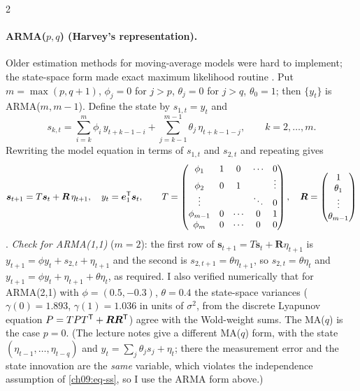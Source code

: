 \begin{paracol}{2}
\paragraph{ARMA($p,q$) (Harvey's representation).} Older estimation methods for moving-average models were hard to implement; the state-space form made exact maximum likelihood routine
. Put $m=\max(p,q+1)$, $\phi_j=0$ for $j>p$, $\theta_j=0$ for $j>q$, $\theta_0=1$; then $\{y_t\}$ is ARMA($m,m-1$). Define the state by $s_{1,t}=y_t$ and
\[
  s_{k,t}=\sum_{i=k}^{m}\phi_i\,y_{t+k-1-i}+\sum_{j=k-1}^{m-1}\theta_j\,\eta_{t+k-1-j},\qquad k=2,\dots,m .
\]
Rewriting the model equation in terms of $s_{1,t}$ and $s_{2,t}$ and repeating gives
\begin{equation}\label{ch09:eq-harvey}
  \bm s_{t+1}=T\bm s_t+\bm R\,\eta_{t+1},\quad y_t=\bm e_1^{\mathsf T}\bm s_t,\qquad
  T=\begin{pmatrix}\phi_1&1&0&\cdots&0\\ \phi_2&0&1&&\vdots\\ \vdots&&&\ddots&0\\ \phi_{m-1}&0&\cdots&0&1\\ \phi_m&0&\cdots&0&0\end{pmatrix},\quad
  \bm R=\begin{pmatrix}1\\ \theta_1\\ \vdots\\ \theta_{m-1}\end{pmatrix}
\end{equation}
. \emph{Check for ARMA(1,1)} ($m=2$): the first row of $\bm s_{t+1}=T\bm s_t+\bm R\eta_{t+1}$ is
$y_{t+1}=\phi y_t+s_{2,t}+\eta_{t+1}$ and the second is $s_{2,t+1}=\theta\eta_{t+1}$, so $s_{2,t}=\theta\eta_t$ and $y_{t+1}=\phi y_t+\eta_{t+1}+\theta\eta_t$, as required. I also
verified numerically that for ARMA(2,1) with $\phi=(0.5,-0.3)$, $\theta=0.4$ the state-space variances ($\gamma(0)=1.893$, $\gamma(1)=1.036$ in units of $\sigma^2$, from the discrete Lyapunov equation
$P=TPT^{\mathsf T}+\bm R\bm R^{\mathsf T}$) agree with the Wold-weight sums. The MA($q$) is the case $p=0$. (The lecture notes give a different MA($q$) form, with the state $(\eta_{t-1},\dots,\eta_{t-q})$ and
$y_t=\sum_j\theta_j s_j+\eta_t$; there the measurement error and the state innovation are the \emph{same} variable, which violates the independence assumption of \eqref{ch09:eq-ss}, so I use the ARMA form above.)


\end{paracol}
